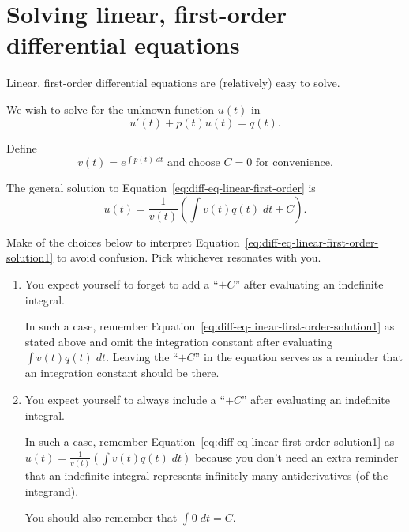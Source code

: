 \documentclass[../main.tex]{subfiles}
\begin{document}
 \section{Solving linear, first-order differential equations}

Linear, first-order differential equations are (relatively) easy to solve.

\begin{thm} \label{thm:diff-eq-linear-first-order}
  We wish to solve for the unknown function \(u(t)\) in
  \begin{equation} \label{eq:diff-eq-linear-first-order}
    u'(t) + p(t) u(t) = q(t).
  \end{equation}
  
  Define
  \begin{equation} \label{eq:diff-eq-integrating-factor}
    v(t) = e^{\int p(t) \;dt} \text{ and choose \(C = 0\) for convenience}.
  \end{equation} 

  The general solution to Equation~\eqref{eq:diff-eq-linear-first-order} is
  \begin{equation} \label{eq:diff-eq-linear-first-order-solution1}
    u(t) = \frac{1}{v(t)} \left( \int v(t) q(t) \;dt + C \right).
  \end{equation}
\end{thm}

\faExclamationTriangle{} Make  of the choices below to interpret Equation~\eqref{eq:diff-eq-linear-first-order-solution1} to avoid confusion.   Pick whichever resonates with you.

\begin{enumerate}
  \item You expect yourself to forget to add a ``\(+C\)'' after evaluating an indefinite integral.

    In such a case, remember Equation~\eqref{eq:diff-eq-linear-first-order-solution1} as stated above and omit the integration constant after evaluating \(\textstyle \int v(t) q(t) \;dt\).  Leaving the ``\(+C\)'' in the equation serves as a reminder that an integration constant should be there.

  \item You expect yourself to always include a ``\(+C\)'' after evaluating an indefinite integral.

    In such a case, remember Equation~\eqref{eq:diff-eq-linear-first-order-solution1} as \(u(t) = \frac{1}{v(t)}\left( \int v(t) q(t) \;dt \right)\) because you don't need an extra reminder that an indefinite integral represents infinitely many antiderivatives (of the integrand).

    You should also remember that \(\textstyle \int 0 \;dt = C\).
\end{enumerate}
\end{document}
